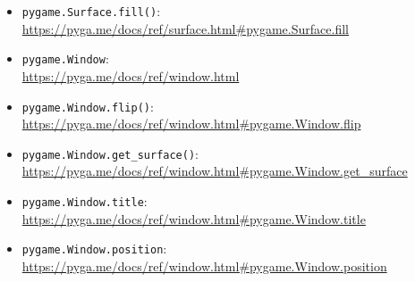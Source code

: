 \begin{itemize}
	\item \texttt{pygame.Surface.fill()}:
	\\
	\url{https://pyga.me/docs/ref/surface.html#pygame.Surface.fill}

	\item \texttt{pygame.Window}:
	\\
	\url{https://pyga.me/docs/ref/window.html}
	
	\item \texttt{pygame.Window.flip()}:
	\\
	\url{https://pyga.me/docs/ref/window.html#pygame.Window.flip}
	
	\item \texttt{pygame.Window.get\_surface()}:
	\\
	\url{https://pyga.me/docs/ref/window.html#pygame.Window.get_surface}
	
	\item \texttt{pygame.Window.title}:
	\\
	\url{https://pyga.me/docs/ref/window.html#pygame.Window.title}
	
	\item \texttt{pygame.Window.position}:
	\\
	\url{https://pyga.me/docs/ref/window.html#pygame.Window.position}
\end{itemize}

